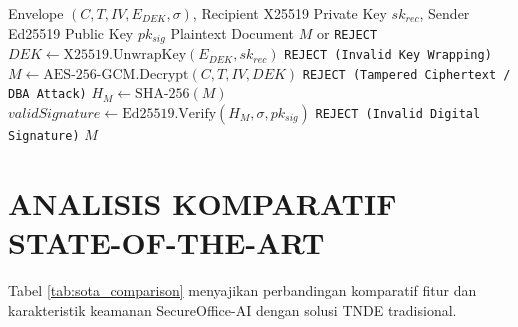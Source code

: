 \documentclass[conference]{IEEEtran}
\begin{document}
\begin{algorithm}[htbp]
\caption{Hybrid Document Unwrapping, AEAD Decryption, and Verification}
\label{alg:decrypt}
\begin{algorithmic}[1]
\REQUIRE Envelope $(C, T, IV, E_{DEK}, \sigma)$, Recipient X25519 Private Key $sk_{rec}$, Sender Ed25519 Public Key $pk_{sig}$
\ENSURE Plaintext Document $M$ or \texttt{REJECT}
\STATE $DEK \leftarrow \text{X25519.UnwrapKey}(E_{DEK}, sk_{rec})$
    \RETURN \texttt{REJECT (Invalid Key Wrapping)}
\ENDIF
\STATE $M \leftarrow \text{AES-256-GCM.Decrypt}(C, T, IV, DEK)$
    \RETURN \texttt{REJECT (Tampered Ciphertext / DBA Attack)}
\ENDIF
\STATE $H_M \leftarrow \text{SHA-256}(M)$
\STATE $validSignature \leftarrow \text{Ed25519.Verify}(H_M, \sigma, pk_{sig})$
    \RETURN \texttt{REJECT (Invalid Digital Signature)}
\ENDIF
\RETURN $M$ 
\end{algorithmic}
\end{algorithm}

\section{ANALISIS KOMPARATIF STATE-OF-THE-ART}

Tabel \ref{tab:sota_comparison} menyajikan perbandingan komparatif fitur dan karakteristik keamanan SecureOffice-AI dengan solusi TNDE tradisional.

\begin{table}[htbp]
\caption{Perbandingan Komparatif SecureOffice-AI dengan Solusi TNDE Traditional}
\label{tab:sota_comparison}
\centering
{}
\end{table}
\end{document}
